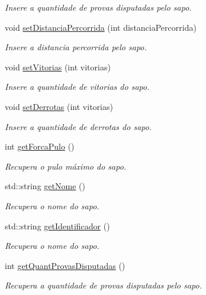 \begin{DoxyCompactItemize}
\begin{DoxyCompactList}\small\item\em Insere a quantidade de provas disputadas pelo sapo. \end{DoxyCompactList}\item 
void \hyperlink{classSapo_add67eaff380b20f5601e7a9779468fd8}{set\+Distancia\+Percorrida} (int distancia\+Percorrida)
\begin{DoxyCompactList}\small\item\em Insere a distancia percorrida pelo sapo. \end{DoxyCompactList}\item 
void \hyperlink{classSapo_ad17d6f03b81c069a3b7e09a42005f1d2}{set\+Vitorias} (int vitorias)
\begin{DoxyCompactList}\small\item\em Insere a quantidade de vitorias do sapo. \end{DoxyCompactList}\item 
void \hyperlink{classSapo_a955c0d19a8cfa0bb0acb6c56fabde4aa}{set\+Derrotas} (int vitorias)
\begin{DoxyCompactList}\small\item\em Insere a quantidade de derrotas do sapo. \end{DoxyCompactList}\item 
int \hyperlink{classSapo_ac6225c3632a30877068c9b2bc50e6ed1}{get\+Forca\+Pulo} ()
\begin{DoxyCompactList}\small\item\em Recupera o pulo máximo do sapo. \end{DoxyCompactList}\item 
std\+::string \hyperlink{classSapo_a632ae419accb86c10fa2bf8164e648aa}{get\+Nome} ()
\begin{DoxyCompactList}\small\item\em Recupera o nome do sapo. \end{DoxyCompactList}\item 
std\+::string \hyperlink{classSapo_a1a9022f5e4a1f561454650b5c99baa3e}{get\+Identificador} ()
\begin{DoxyCompactList}\small\item\em Recupera o nome do sapo. \end{DoxyCompactList}\item 
int \hyperlink{classSapo_ab111c0490da381fb037ab7be723cfc54}{get\+Quant\+Provas\+Disputadas} ()
\begin{DoxyCompactList}\small\item\em Recupera a quantidade de provas disputadas pelo sapo. \end{DoxyCompactList}\item 

\end{DoxyCompactItemize}
